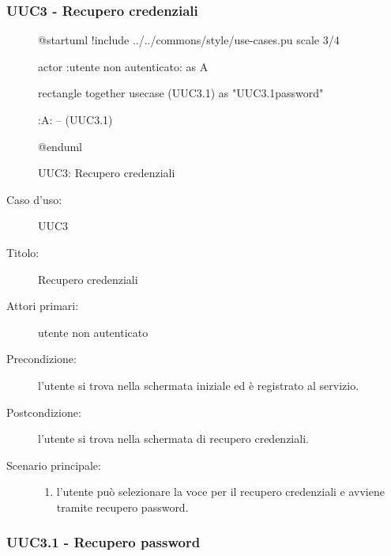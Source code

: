 \documentclass[../analisi-dei-requisiti.tex]{subfiles}
\begin{document}
\subsubsection{UUC3 - Recupero credenziali}%
\label{subsub:UUC3utente}

\begin{figure}[h!]
  \centering
  \begin{plantuml}
  @startuml
  !include ../../commons/style/use-cases.pu
  scale 3/4

  actor :utente non autenticato: as A

  rectangle {
    together {
      usecase (UUC3.1) as "UUC3.1\nRecupero password"
    }
  }

  :A: -- (UUC3.1)

  @enduml
  \end{plantuml}
  \caption{UUC3: Recupero credenziali}
  \label{fig:uuc3}
\end{figure}

\begin{description}
  \item[Caso d’uso:] UUC3
  \item[Titolo:] Recupero credenziali
  \item[Attori primari:] utente non autenticato
  \item[Precondizione:] l'utente si trova nella schermata iniziale ed è registrato al servizio.
  \item[Postcondizione:] l'utente si trova nella schermata di recupero credenziali.
  \item[Scenario principale:]
        \begin{enumerate}
          \item l'utente può selezionare la voce per il recupero credenziali e avviene tramite recupero password.
        \end{enumerate}
\end{description}

\subsubsection{UUC3.1 - Recupero password}%
\label{subsub:UUC3.1utente}
\end{document}
